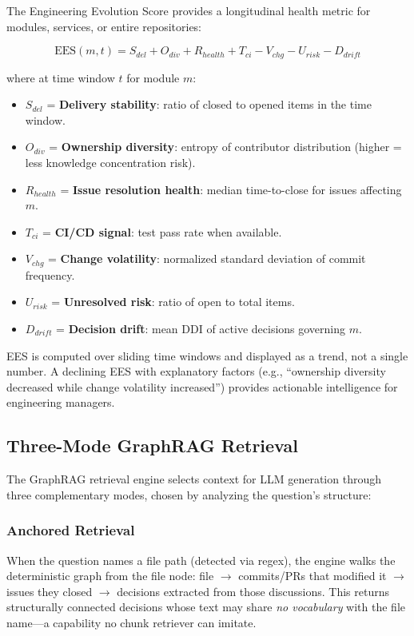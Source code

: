 \documentclass[conference]{IEEEtran}
\begin{document}
The Engineering Evolution Score provides a longitudinal health metric for modules, services, or entire repositories:

\begin{equation}
\text{EES}(m, t) = S_{del} + O_{div} + R_{health} + T_{ci} - V_{chg} - U_{risk} - D_{drift}
\end{equation}

where at time window $t$ for module $m$:
\begin{itemize}
    \item $S_{del}$ = \textbf{Delivery stability}: ratio of closed to opened items in the time window.
    \item $O_{div}$ = \textbf{Ownership diversity}: entropy of contributor distribution (higher = less knowledge concentration risk).
    \item $R_{health}$ = \textbf{Issue resolution health}: median time-to-close for issues affecting $m$.
    \item $T_{ci}$ = \textbf{CI/CD signal}: test pass rate when available.
    \item $V_{chg}$ = \textbf{Change volatility}: normalized standard deviation of commit frequency.
    \item $U_{risk}$ = \textbf{Unresolved risk}: ratio of open to total items.
    \item $D_{drift}$ = \textbf{Decision drift}: mean DDI of active decisions governing $m$.
\end{itemize}

EES is computed over sliding time windows and displayed as a trend, not a single number. A declining EES with explanatory factors (e.g., ``ownership diversity decreased while change volatility increased'') provides actionable intelligence for engineering managers.

\subsection{Three-Mode GraphRAG Retrieval}

The GraphRAG retrieval engine selects context for LLM generation through three complementary modes, chosen by analyzing the question's structure:

\subsubsection{Anchored Retrieval}
When the question names a file path (detected via regex), the engine walks the deterministic graph from the file node: file $\rightarrow$ commits/PRs that modified it $\rightarrow$ issues they closed $\rightarrow$ decisions extracted from those discussions. This returns structurally connected decisions whose text may share \emph{no vocabulary} with the file name---a capability no chunk retriever can imitate.
\end{document}
